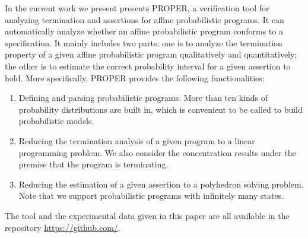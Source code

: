\documentclass[sigconf,review, anonymous]{acmart}
\begin{document}
In the current work we present presents PROPER, a verification tool for analyzing termination and assertions for affine probabilistic programs. It can automatically analyze whether an affine  probabilistic program conforms to a specification.
It mainly includes two parts: one is to analyze the termination property of a given affine probabilistic program qualitatively and quantitatively; the other is to estimate the correct probability interval for a given assertion to hold.
More specifically, PROPER provides the following functionalities:
\begin{enumerate}
	\item Defining and parsing probabilistic programs. More than ten kinds of probability distributions are built in, which is convenient to be called to build probabilistic models.
    \item Reducing the termination analysis of a given program to a linear programming problem. We also consider the concentration results under the premise that the program is terminating.
	\item Reducing the estimation of a given assertion to a polyhedron solving problem. Note that we support probabilistic programs with infinitely many states.	
\end{enumerate}
The tool and the experimental data given in this paper are all available in the repository \url{https://github.com/}.
\end{document}
